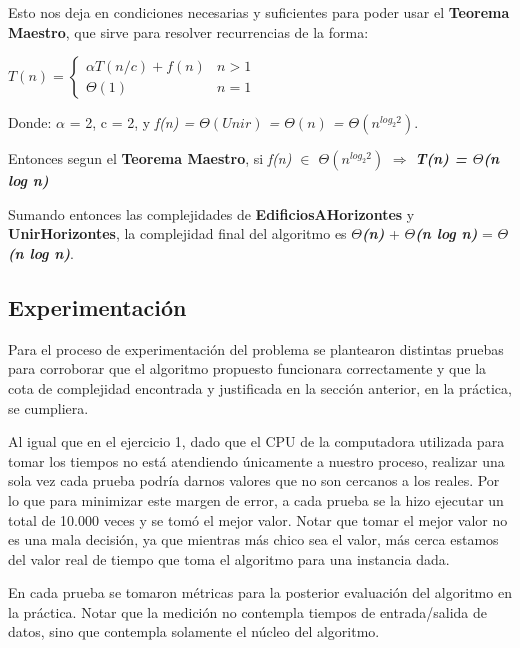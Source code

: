 \documentclass[10pt,a4paper]{article}
\begin{document}
\begin{enumerate}
Esto nos deja en condiciones necesarias y suficientes para poder usar el \textbf{Teorema Maestro}, que sirve para resolver recurrencias de la forma:

\bigskip
$T(n) =\begin{cases} \alpha T(n/c) + f(n) & n > 1 \\ \Theta(1) & n = 1 \end{cases}$

\bigskip
Donde: $\alpha$ = 2, c = 2, y \textit{f(n) =  $\Theta(Unir)$ = $\Theta(n)$ = $\Theta(n^{log_{2}2})$}.

\bigskip
Entonces segun el \textbf{Teorema Maestro}, si \textit{f(n) $\in$ $\Theta(n^{log_{2}2})$} $\Rightarrow$ \textbf{\textit{T(n) = $\Theta$(n log n)}}
\end{enumerate}

\bigskip

Sumando entonces las complejidades de \textbf{EdificiosAHorizontes} y \textbf{UnirHorizontes}, la complejidad final del algoritmo es \textbf{$\Theta$\textit{(n)}} + \textbf{$\Theta$\textit{(n log n)}} = \textbf{$\Theta$\textit{(n log n)}}.

\newpage

\subsection{Experimentación}

Para el proceso de experimentación del problema se plantearon distintas pruebas para corroborar que el algoritmo propuesto funcionara correctamente y que la cota de complejidad encontrada y justificada en la sección anterior, en la práctica, se cumpliera.

Al igual que en el ejercicio 1, dado que el CPU de la computadora utilizada para tomar los tiempos no está atendiendo únicamente a nuestro proceso, realizar una sola vez cada prueba podría darnos valores que no son cercanos a los reales. Por lo que para minimizar este margen de error, a cada prueba se la hizo ejecutar un total de 10.000 veces y se tomó el mejor valor. Notar que tomar el mejor valor no es una mala decisión, ya que mientras más chico sea el valor, más cerca estamos del valor real de tiempo que toma el algoritmo para una instancia dada.

En cada prueba se tomaron métricas para la posterior evaluación del algoritmo en la práctica. Notar que la medición no contempla tiempos de entrada/salida de datos, sino que contempla solamente el núcleo del algoritmo.
\end{document}
